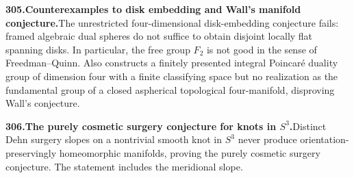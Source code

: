 \documentclass[11pt,a4paper]{article}
\begin{document}
  \par \begin{minipage}{\linewidth}
  \fontsize{10.5}{12.6}\selectfont\RaggedRight
  \hypertarget{result 305}{}
  {\bfseries\textcolor{muted}{305.}\enspace Counterexamples to disk embedding and Wall's manifold conjecture.}\enspace The unrestricted four-dimensional disk-embedding conjecture fails: framed algebraic dual spheres do not suffice to obtain disjoint locally flat spanning disks. In particular, the free group $F_2$ is not good in the sense of Freedman--Quinn. Also constructs a finitely presented integral Poincaré duality group of dimension four with a finite classifying space but no realization as the fundamental group of a closed aspherical topological four-manifold, disproving Wall's conjecture.\par
  \end{minipage}\par\vspace{5pt}



  \par \begin{minipage}{\linewidth}
  \fontsize{10.5}{12.6}\selectfont\RaggedRight
  \hypertarget{result 306}{}
  {\bfseries\textcolor{muted}{306.}\enspace The purely cosmetic surgery conjecture for knots in $S^3$.}\enspace Distinct Dehn surgery slopes on a nontrivial smooth knot in $S^3$ never produce orientation-preservingly homeomorphic manifolds, proving the purely cosmetic surgery conjecture. The statement includes the meridional slope.\par
  \end{minipage}\par\vspace{5pt}
\end{document}
